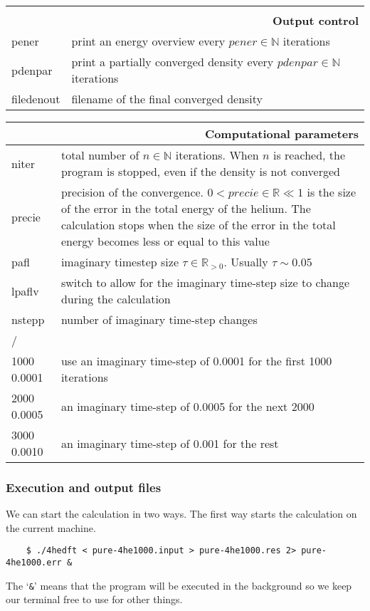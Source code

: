 \documentclass[10pt,a4paper]{article}
\begin{document}
\begin{center}
		\begin{tabular}{l|p{9.6cm}}
			\multicolumn{2}{r}{\textbf{}}	\\
			\multicolumn{2}{r}{\textbf{Output control}}	\\
			\hline\hline
			pener & print an energy overview every $pener\in\mathbb{N}$ iterations	\\
			\hline
			pdenpar	& print a partially converged density every $pdenpar\in\mathbb{N}$ iterations	\\
			\hline
			filedenout 	& filename of the final converged density
		\end{tabular}
		\begin{tabular}{l|p{9.6cm}}
			\multicolumn{2}{r}{\textbf{Computational parameters}}	\\
			\hline\hline
			niter		& total number of $n\in\mathbb{N}$ iterations. When $n$ is reached, the program is stopped, even if the density is not converged\\
			\hline
			precie		& precision of the convergence. $0<precie\in\mathbb{R}\ll1$ is the size of the error in the total energy of the helium. The calculation stops when the size of the error in the total energy becomes less or equal to this value \\
			\hline
			pafl		& imaginary timestep size $\tau\in\mathbb{R}_{>0}$. Usually $\tau\sim0.05$\\
			\hline
			lpaflv		& switch to allow for the imaginary time-step size to change during the calculation\\
			\hline
			nstepp		& number of imaginary time-step changes\\
			\hline
			/ & 	\\
			1000 0.0001 & use an imaginary time-step of 0.0001 for the first 1000 iterations \\
			2000 0.0005 & an imaginary time-step of 0.0005 for the next 2000  \\
			3000	0.0010 & an imaginary time-step of 0.001 for the rest
		\end{tabular}
	\end{center}
	
	\subsubsection{Execution and output files}
	We can start the calculation in two ways. The first way starts the calculation on the current machine.
	\begin{verbatim}
	$ ./4hedft < pure-4he1000.input > pure-4he1000.res 2> pure-4he1000.err &
	\end{verbatim}
	The `\verb|&|' means that the program will be executed in the background so we keep our terminal free to use for other things.
	
\end{document}
